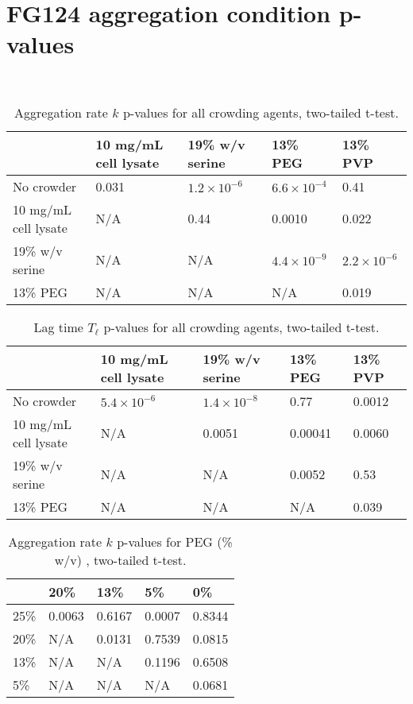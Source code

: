 \chapter{FG124 aggregation condition p-values}~\label{appx:p-values}

\begin{table}[b!]
  \caption[Aggregation rate p-values for all crowding agents.]{Aggregation rate $k$ p-values for all crowding agents, two-tailed t-test.}
    \label{table:p-k-values-all}
    \begin{tabular}{p{4cm}|p{3.5cm}p{3cm}p{2cm}p{2cm}}
        &10 mg/mL cell lysate &  19\% w/v serine & 13\% PEG & 13\% PVP\\
      \hline
	No crowder   & 0.031 & $1.2 \times 10^{-6}$ & $6.6\times 10^{-4}$ &0.41\\
	10 mg/mL cell lysate   & N/A & 0.44 & 0.0010 &  0.022\\
     	19\% w/v serine & N/A  & N/A & $4.4\times 10^{-9}$ & $2.2\times 10^{-6}$\\
      	13\% PEG    & N/A & N/A  & N/A & 0.019\\
    \end{tabular}
\end{table}

\begin{table}[b!]
  \caption[Lag time p-values for all crowding agents.]{Lag time $T_\ell$ p-values for all crowding agents, two-tailed t-test.}
    \label{table:p-tl-values-all}
    \begin{tabular}{p{4cm}|p{3.5cm}p{3cm}p{2cm}p{2cm}}
        &10 mg/mL cell lysate &  19\% w/v serine & 13\% PEG & 13\% PVP\\
      \hline
	No crowder   & $5.4 \times 10^{-6}$ & $1.4 \times 10^{-8}$ & 0.77 &0.0012\\
	10 mg/mL cell lysate   & N/A & 0.0051 & 0.00041 &  0.0060\\
     	19\% w/v serine & N/A  & N/A & 0.0052 & 0.53\\
      	13\% PEG    & N/A & N/A  & N/A & 0.039\\
    \end{tabular}
\end{table}

\begin{table}[b!]
  \caption[Aggregation rate p-values for PEG.]{Aggregation rate $k$ p-values for PEG (\% w/v) , two-tailed t-test.}
    \label{table:p-k-values-peg}
    \begin{tabular}{p{2cm}|p{3cm}p{3cm}p{3cm}p{3cm}}
        &20\% &  13\% & 5\% & 0\% \\ \hline
	25\% & 0.0063 & 0.6167 & 0.0007 &0.8344\\
	20\% & N/A &0.0131 & 0.7539 & 0.0815\\
     	13\% & N/A  & N/A & 0.1196 & 0.6508\\
      	5\% & N/A & N/A  & N/A & 0.0681\\
    \end{tabular}
\end{table}

